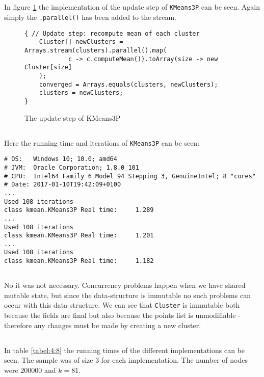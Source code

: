 \subsection{}
In figure \ref{code:4:5} the implementation of the update step of \texttt{KMeans3P} can be seen. Again simply the \texttt{.parallel()} has been added to the stream. 
\begin{figure}
\begin{lstlisting}
{ // Update step: recompute mean of each cluster
    Cluster[] newClusters = Arrays.stream(clusters).parallel().map(
            c -> c.computeMean()).toArray(size -> new Cluster[size]
    );
    converged = Arrays.equals(clusters, newClusters);
    clusters = newClusters;
}
\end{lstlisting}
\caption{The update step of KMeans3P}
\label{code:4:5}
\end{figure}

\subsection{}
Here the running time and iterations of \texttt{KMeans3P} can be seen:

\begin{lstlisting}
# OS:   Windows 10; 10.0; amd64
# JVM:  Oracle Corporation; 1.8.0_101
# CPU:  Intel64 Family 6 Model 94 Stepping 3, GenuineIntel; 8 "cores"
# Date: 2017-01-10T19:42:09+0100
...
Used 108 iterations
class kmean.KMeans3P Real time:     1.289
...
Used 108 iterations
class kmean.KMeans3P Real time:     1.201
...
Used 108 iterations
class kmean.KMeans3P Real time:     1.182
\end{lstlisting}

\subsection{}
No it was not necessary. Concurrency problems happen when we have shared mutable state, but since the data-structure is immutable no such problems can occur with this data-structure. We can see that \texttt{Cluster} is immutable both because the fields are final but also because the points list is unmodifiable - therefore any changes must be made by creating a new cluster.

\subsection{}
In table \ref{tabel:4:8} the running times of the different implementations can be seen. The sample was of size 3 for each implementation. The number of nodes were $200 000$ and $k=81$. 

